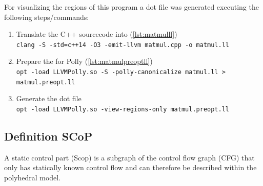 For visualizing the regions of this program a dot file was generated executing the following steps/commands:
\begin{enumerate}
    \item Translate the C++ sourcecode into \llvmir (\autoref{lst:matmulll})\\
        \texttt{clang -S -std=c++14 -O3 -emit-llvm matmul.cpp -o matmul.ll}
    \item Prepare the \llvmir for Polly (\autoref{lst:matmulpreoptll})\\
        \texttt{opt -load LLVMPolly.so -S -polly-canonicalize matmul.ll > matmul.preopt.ll}
    \item Generate the dot file\\
        \texttt{opt -load LLVMPolly.so -view-regions-only matmul.preopt.ll}
\end{enumerate}
\subsection{Definition SCoP}

A static control part (Scop) is a subgraph of the control flow graph (CFG) that only has statically known control flow and can therefore be described within the polyhedral model.

